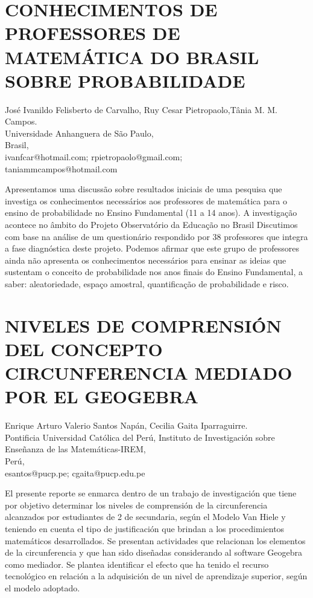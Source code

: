 \section{CONHECIMENTOS DE PROFESSORES DE MATEMÁTICA DO BRASIL SOBRE PROBABILIDADE }

\begin{datos}
José Ivanildo Felisberto de Carvalho, Ruy Cesar Pietropaolo,Tânia M. M. Campos.\\
Universidade Anhanguera de São Paulo,\\
\hfill Brasil, \\
\hfill ivanfcar@hotmail.com; rpietropaolo@gmail.com;\\
\hfill taniammcampos@hotmail.com
\end{datos}

Apresentamos uma discussão sobre resultados iniciais de uma pesquisa
que investiga os conhecimentos necessários aos professores de matemática
para o ensino de probabilidade no Ensino Fundamental (11 a 14 anos).
A investigação acontece no âmbito do Projeto Observatório da Educação
no Brasil Discutimos com base na análise de um questionário respondido
por 38 professores que integra a fase diagnóstica deste projeto. Podemos
afirmar que este grupo de professores ainda não apresenta os conhecimentos
necessários para ensinar as ideias que sustentam o conceito de probabilidade
nos anos finais do Ensino Fundamental, a saber: aleatoriedade, espaço
amostral, quantificação de probabilidade e risco. \newpage


\section{NIVELES DE COMPRENSIÓN DEL CONCEPTO CIRCUNFERENCIA MEDIADO POR EL
GEOGEBRA}

\begin{datos}
Enrique Arturo Valerio Santos Napán, Cecilia Gaita Iparraguirre.\\
Pontificia Universidad Católica del Perú, Instituto de Investigación sobre Enseñanza de las Matemáticas-IREM,\\
\hfill Perú, \\
\hfill esantos@pucp.pe; cgaita@pucp.edu.pe
\end{datos}

El presente reporte se enmarca dentro de un trabajo de investigación
que tiene por objetivo determinar los niveles de comprensión de la
circunferencia alcanzados por estudiantes de 2\textdegree{} de secundaria,
según el Modelo Van Hiele y teniendo en cuenta el tipo de justificación
que brindan a los procedimientos matemáticos desarrollados. Se presentan
actividades que relacionan los elementos de la circunferencia y que
han sido diseñadas considerando al software Geogebra como mediador.
Se plantea identificar el efecto que ha tenido el recurso tecnológico
en relación a la adquisición de un nivel de aprendizaje superior,
según el modelo adoptado. 


